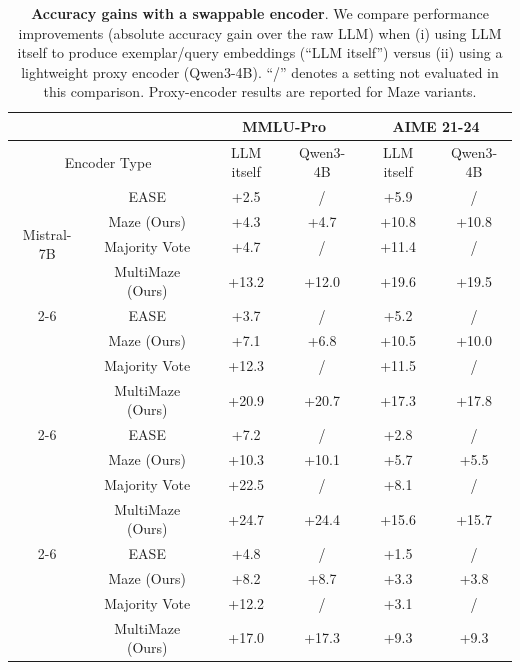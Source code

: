 \begin{table}[ht]
\caption{
{\bf Accuracy gains with a swappable encoder}. 
We compare performance improvements (absolute accuracy gain over the raw LLM) when (i) using LLM itself to produce exemplar/query embeddings (``LLM itself'') versus (ii) using a lightweight proxy encoder (Qwen3-4B). 
``/'' denotes a setting not evaluated in this comparison. Proxy-encoder results are reported for Maze variants.
}
\label{app-tab: swap-encoder}
\centering
\small
\begin{tabular}{@{}cccccc@{}}
\toprule
 &  & \multicolumn{2}{c}{MMLU-Pro} & \multicolumn{2}{c}{AIME 21-24} \\ \midrule
\multicolumn{2}{c}{Encoder Type} & LLM itself & Qwen3-4B & LLM itself & Qwen3-4B \\ \midrule
\multirow{4}{*}{Mistral-7B} 
 & EASE & +2.5 & / & +5.9 & / \\
 & Maze (Ours) & +4.3 & +4.7 & +10.8 & +10.8 \\
 & Majority Vote & +4.7 & / & +11.4 & / \\
 & MultiMaze (Ours) & +13.2 & +12.0 & +19.6 & +19.5 \\ \cmidrule(l){2-6} 
\multirow{4}{*}{LLaMA3-8B} 
 & EASE & +3.7 & / & +5.2 & / \\
 & Maze (Ours) & +7.1 & +6.8 & +10.5 & +10.0 \\
 & Majority Vote & +12.3 & / & +11.5 & / \\
 & MultiMaze (Ours) & +20.9 & +20.7 & +17.3 & +17.8 \\ \cmidrule(l){2-6} 
\multirow{4}{*}{Qwen3-8B} 
 & EASE & +7.2 & / & +2.8 & / \\
 & Maze (Ours) & +10.3 & +10.1 & +5.7 & +5.5 \\
 & Majority Vote & +22.5 & / & +8.1 & / \\
 & MultiMaze (Ours) & +24.7 & +24.4 & +15.6 & +15.7 \\ \cmidrule(l){2-6} 
\multirow{4}{*}{Qwen3-14B} 
 & EASE & +4.8 & / & +1.5 & / \\
 & Maze (Ours) & +8.2 & +8.7 & +3.3 & +3.8 \\
 & Majority Vote & +12.2 & / & +3.1 & / \\
 & MultiMaze (Ours) & +17.0 & +17.3 & +9.3 & +9.3 \\ \bottomrule 
\end{tabular}
\end{table}

